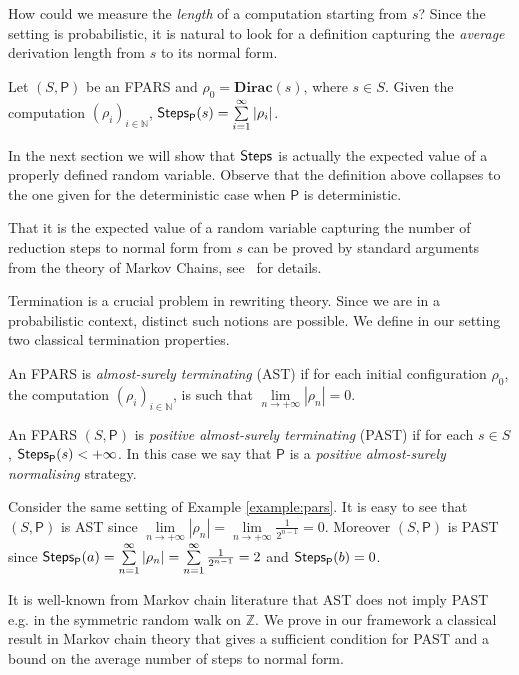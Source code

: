 How could we measure the \emph{length} of a computation starting from $s$? Since the setting is probabilistic, it is natural
to look for a definition capturing the \emph{average} derivation length from
$s$ to its normal form. 
\begin{definition}
	Let $(S,\mathsf{P})$ be an FPARS and $\rho_0=\mathbf{Dirac}(s)$,
	where $s\in S$. Given the computation $(\rho_i)_{i\in\mathbb{N}}$,
	$\textsf{Steps}_{\mathsf{P}}(s)=\sum\limits_{i=1}^{\infty} \left|\rho_i\right|$.
\end{definition}
In the next section we will show that $\textsf{Steps}_{}$ is actually the expected value of a properly defined random variable. Observe that the definition above collapses to the one given for the
deterministic case when $\mathsf{P}$ is deterministic. 
\begin{SHORT}
	That it is the expected value of a random variable capturing the number of reduction
	steps to normal form from $s$ can be proved by standard arguments
	from the theory of Markov Chains, see~\cite{EV} for details.
\end{SHORT}
Termination is a crucial problem in rewriting theory. Since we are in
a probabilistic context, distinct such notions are
possible. We define in our setting two classical termination
properties.  
\begin{definition}
	An FPARS is \emph{almost-surely terminating} (AST) if for each initial configuration $\rho_0$, the computation $(\rho_i)_{i\in\mathbb{N}}$, is such that $\underset{n\rightarrow +\infty}{\lim}\left|\rho_{n}\right|=0$.
\end{definition}
\begin{definition}
	An FPARS $(S,\mathsf{P})$ is \emph{positive almost-surely terminating} (PAST) if for each $s \in S$,
	$\textsf{Steps}_{\mathsf{P}}(s)< +\infty$.
	In this case we say that $\mathsf{P}$ is a \emph{positive almost-surely normalising} strategy.
\end{definition}
\begin{example}
	Consider the same setting of Example \ref{example:pars}. It is easy to see that $(S,\mathsf{P})$ is AST since $\underset{n\rightarrow +\infty}{\lim}\left|\rho_{n}\right|=\underset{n\rightarrow +\infty}{\lim}\frac{1}{2^{n-1}}=0$. Moreover $(S,\mathsf{P})$ is PAST since $\textsf{Steps}_{\mathsf{P}}(a)=\sum\limits_{n=1}^{\infty} \left|\rho_n\right|=\sum\limits_{n=1}^{\infty}\frac{1}{2^{n-1}}=2$ and $\textsf{Steps}_{\mathsf{P}}(b)=0$.
\end{example}
It is well-known from Markov chain literature that AST does not imply PAST e.g. in the symmetric random walk on $\mathbb{Z}$. We prove in our framework a classical result in Markov chain theory that gives a sufficient condition for PAST and a bound on the average number of steps to normal form.
